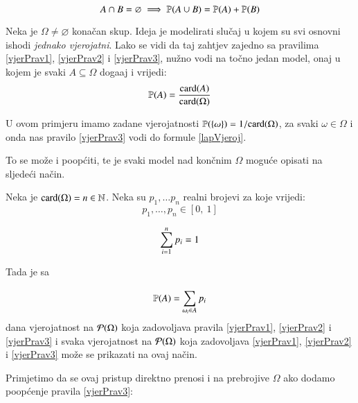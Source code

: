 \begin{equation} \label{vjerPrav3}
    A \cap B = \varnothing \implies \mathbb{P}({A \cup B}) = \mathbb{P}({A})
        + \mathbb{P}({B})
\end{equation}

\begin{pr} \label{primjer5}
    Neka je $\Omega \neq \varnothing$ kona\v can skup. Ideja je
    modelirati slu\v caj u kojem su svi osnovni ishodi \emph{jednako
    vjerojatni}. Lako se vidi da taj zahtjev zajedno sa pravilima
    \eqref{vjerPrav1}, \eqref{vjerPrav2} i \eqref{vjerPrav3},
    nu\v zno vodi na to\v cno jedan model, onaj u kojem je svaki
    $A \subseteq \Omega$ doga\dj aj i vrijedi:
    \begin{equation} \label{lapVjeroj}
        \mathbb{P}({A}) = \frac{\textnormal{card}({A})}{\textnormal{card}({\Omega})}
    \end{equation}
\end{pr}

U ovom primjeru imamo zadane vjerojatnosti $\mathbb{P}({\{ \omega\}})
= 1 / {\textnormal{card}({\Omega})}$, za svaki $\omega \in \Omega$ i onda nas
pravilo \eqref{vjerPrav3} vodi do formule \eqref{lapVjeroj}.

To se mo\v ze i poop\' citi, te je svaki model nad kon\v cnim
$\Omega$ mogu\' ce opisati na sljede\' ci na\v cin.

\begin{pr} \label{primjer7}
    Neka je $\textnormal{card}({\Omega}) = n \in \mathbb{N}$. Neka su $p_1, \dots p_n$
    realni brojevi za koje vrijedi:
    \begin{equation}
        p_1, \dots, p_n \in [0, \: 1]
    \end{equation}

    \begin{equation}
        \sum\limits_{i = 1}^{n} p_i = 1
    \end{equation}

    Tada je sa

    \begin{equation} \label{konacVP}
        \mathbb{P}({A}) = \sum\limits_{\omega_i \in A}^{} p_i
    \end{equation}
    dana vjerojatnost na $\mathcal{P}({\Omega})$ koja zadovoljava
    pravila \eqref{vjerPrav1}, \eqref{vjerPrav2} i \eqref{vjerPrav3}
    i svaka vjerojatnost na $\mathcal{P}({\Omega})$ koja zadovoljava
    \eqref{vjerPrav1}, \eqref{vjerPrav2} i \eqref{vjerPrav3} mo\v ze
    se prikazati na ovaj na\v cin.
\end{pr}

Primjetimo da se ovaj pristup direktno prenosi i na prebrojive
$\Omega$ ako dodamo poop\' cenje pravila \eqref{vjerPrav3}:


